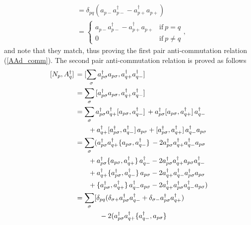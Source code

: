 \documentclass[10pt]{article}
\begin{document}
\begin{appendices}
\begin{align}
\\
&=
\delta_{pq}(a_{p-}a^\dagger_{p-}-a^\dagger_{p+}a_{p+})
\\
&=
\begin{cases}
a_{p-}a^\dagger_{p-}-a^\dagger_{p+}a_{p+} & \text{if} \ p=q
\\
0 & \text{if} \ p\neq q
\end{cases},
\end{align}
and note that they match, thus proving the first pair anti-commutation relation (\ref{AAd_comm}). The second pair anti-commutation relation is proved as follows
\begin{align}
\comm*{N_p}{A^\dagger_q}
&=
\comm*{\sum_\sigma a^\dagger_{p\sigma}a_{p\sigma}}{a^\dagger_{q+}a^\dagger_{q-}}
\\
&=
\sum_\sigma
\comm*{a^\dagger_{p\sigma}a_{p\sigma}}{a^\dagger_{q+}a^\dagger_{q-}}
\\
&=
\sum_\sigma 
a^\dagger_{p\sigma}a^\dagger_{q+}\comm*{a_{p\sigma}}{a^\dagger_{q-}}
+
a^\dagger_{p\sigma}\comm*{a_{p\sigma}}{a^\dagger_{q+}}a^\dagger_{q-}
\nonumber
\\
& \hspace{6.6mm}+
a^\dagger_{q+}\comm*{a^\dagger_{p\sigma}}{a^\dagger_{q-}}a_{p\sigma}
+
\comm*{a^\dagger_{p\sigma}}{a^\dagger_{q+}}a^\dagger_{q-}a_{p\sigma}
\\
&=
\sum_\sigma
(
a^\dagger_{p\sigma}a^\dagger_{q+}\acomm*{a_{p\sigma}}{a^\dagger_{q-}}
-2
a^\dagger_{p\sigma}a^\dagger_{q+}a^\dagger_{q-}a_{p\sigma}
\nonumber
\\
& \hspace{6.6mm} +
a^\dagger_{p\sigma}\acomm*{a_{p\sigma}}{a^\dagger_{q+}}a^\dagger_{q-}
-2
a^\dagger_{p\sigma}a^\dagger_{q+}a_{p\sigma}a^\dagger_{q-}
\nonumber
\\
& \hspace{6.6mm} +
a^\dagger_{q+}\acomm*{a^\dagger_{p\sigma}}{a^\dagger_{q-}}a_{p\sigma}
-2
a^\dagger_{q+}a^\dagger_{q-}a^\dagger_{p\sigma}a_{p\sigma}
\nonumber
\\
& \hspace{6.6mm} +
\acomm*{a^\dagger_{p\sigma}}{a^\dagger_{q+}}a^\dagger_{q-}a_{p\sigma}
-2
a^\dagger_{q+}a^\dagger_{p\sigma}a^\dagger_{q-}a_{p\sigma}
)
\\
&=
\sum_\sigma 
[
\delta_{pq}(
\delta_{\sigma+}a^\dagger_{p\sigma}a^\dagger_{q-}
+
\delta_{\sigma-}a^\dagger_{p\sigma}a^\dagger_{q+}
)
\nonumber
\\
& \hspace{12.25mm} -2
(
a^\dagger_{p\sigma}a^\dagger_{q+}\acomm*{a^\dagger_{q-}}{a_{p\sigma}}

\end{align}
\end{appendices}
\end{document}
